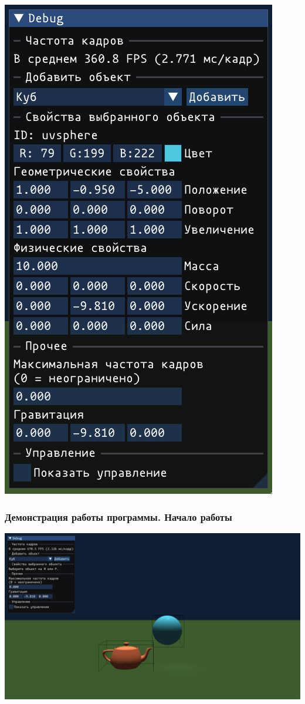\documentclass{beamer}
\begin{document}
\begin{frame}
\includegraphics[height=0.9\textheight]{img/demo-iobject}
\end{frame}

\begin{frame}
\frametitle{Демонстрация работы программы. Начало работы}
\centering
\includegraphics[width=1\textwidth]{img/demo-start}
\end{frame}
\end{document}
